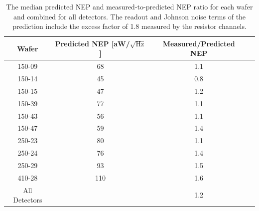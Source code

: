 \begin{table}[ht!]
\begin{center}
\begin{tabular}{|c|c|c|c|}
\hline  Wafer & Predicted NEP [aW/$\sqrt{\mathrm{Hz}}$] & Measured/Predicted NEP \\
\hline 150-09 & 68 & 1.1 \\
\hline 150-14 & 45 & 0.8 \\
\hline 150-15 & 47 & 1.2 \\
\hline 150-39 & 77 & 1.1 \\
\hline 150-43 & 56 & 1.1 \\
\hline 150-47 & 59 & 1.4 \\
\hline 250-23 & 80 & 1.1 \\
\hline 250-24 & 76 & 1.4 \\
\hline 250-29 & 93 & 1.5 \\
\hline 
410-28 & 110 & 1.6 \\
\hline
All Detectors &  & 1.2 \\
\hline
\end{tabular}
\end{center}
\caption[Each wafer's median in-transition NEP prediction and ratio of measured-to-predicted NEP]{The median predicted \ac{NEP} and measured-to-predicted \ac{NEP} ratio for each wafer and combined for 
all detectors.
The readout and Johnson noise terms of the prediction include the excess factor of 1.8 measured by the resistor channels.  
}
\label{tab:in_transition_noise_table}
\end{table}





